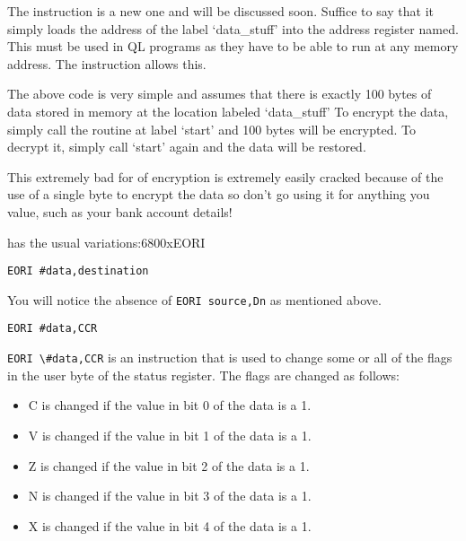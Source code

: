 The  instruction is a new one and will be discussed soon. Suffice
    to say that it simply loads the address of the label `data\_stuff' into the
    address register named. This must be used in QL programs as they have to
    be able to run at any memory address. The  instruction allows
    this.

The above code is very simple and assumes that there is exactly 100
    bytes of data stored in memory at the location labeled `data\_stuff' To
    encrypt the data, simply call the routine at label `start' and 100 bytes
    will be encrypted. To decrypt it, simply call `start' again and the data
    will be restored. 

\begin{warning}This extremely bad for of encryption is extremely easily cracked because of the use of a single
    byte to encrypt the data so don't go using it for anything you value, such as your bank account details!
\end{warning}

 has the usual variations:\mc6800x{EORI}

\begin{lstlisting}[firstnumber=1,]
          EORI #data,destination
\end{lstlisting}

You will notice the absence of \lstinline{EORI source,Dn} as mentioned
    above.

\begin{lstlisting}[firstnumber=1,]
          EORI #data,CCR
\end{lstlisting}

\lstinline{EORI \#data,CCR} is an instruction that is used to change some or all
    of the flags in the user byte of the status register. The flags are
    changed as follows:
\begin{itemize}[itemsep=0pt]

\item{}C is changed if the value in bit 0 of the data is a 1.


\item{}V is changed if the value in bit 1 of the data is a 1.


\item{}Z is changed if the value in bit 2 of the data is a 1.


\item{}N is changed if the value in bit 3 of the data is a 1.


\item{}X is changed if the value in bit 4 of the data is a 1.

\end{itemize}

